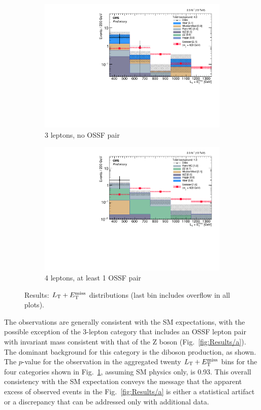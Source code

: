 \begin{figure}
\begin{center}
\begin{subfigure}[b]{.5\textwidth}
		\includegraphics[width=\textwidth]{Results/plots/L3DY0}
		\caption{3 leptons, no OSSF pair}
	\end{subfigure}%
	\begin{subfigure}[b]{.5\textwidth}
		\includegraphics[width=\textwidth]{Results/plots/L4DYgt0}
		\caption{4 leptons, at least 1 OSSF pair}
	\end{subfigure}%
	\caption{Results: $L_\textrm{T} + E_{\mathrm{T}}^{\text{miss}}$ distributions (last bin includes overflow in all plots).
	\label{fig:Results}}
\end{center}
\end{figure}

The observations are generally consistent with the SM expectations, with the possible exception of the 3-lepton category that includes an OSSF lepton pair with invariant mass consistent with that of the Z boson (Fig.~\ref{fig:Results/a}). The dominant background for this category is the \WZ diboson production, as shown. The $p$-value for the observation in the aggregated twenty $L_\textrm{T} + E_{\mathrm{T}}^{\text{miss}}$ bins for the four categories shown in Fig.~\ref{fig:Results}, assuming SM physics only, is 0.93. This overall consistency with the SM expectation conveys the message that the apparent excess of observed events in the Fig.~\ref{fig:Results/a} is either a statistical artifact or a discrepancy that can be addressed only with additional data.

